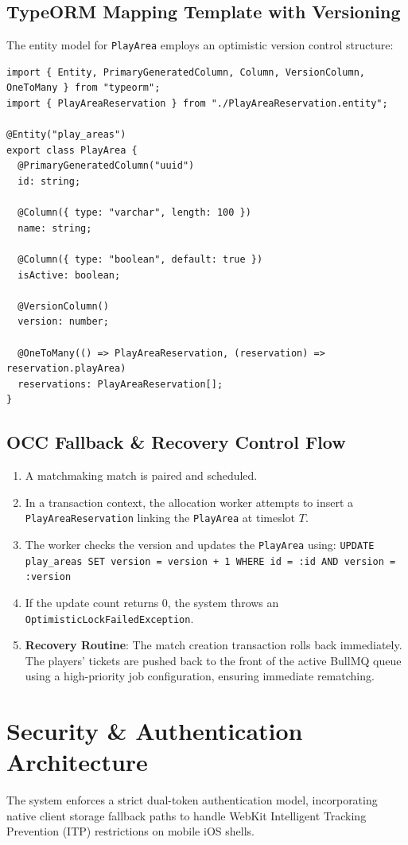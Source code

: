 \documentclass[11pt,a4paper]{report}
\begin{document}
\subsection{TypeORM Mapping Template with Versioning}
The entity model for \texttt{PlayArea} employs an optimistic version control structure:
\begin{lstlisting}[caption={PlayArea Entity TypeORM Definition}]
import { Entity, PrimaryGeneratedColumn, Column, VersionColumn, OneToMany } from "typeorm";
import { PlayAreaReservation } from "./PlayAreaReservation.entity";

@Entity("play_areas")
export class PlayArea {
  @PrimaryGeneratedColumn("uuid")
  id: string;

  @Column({ type: "varchar", length: 100 })
  name: string;

  @Column({ type: "boolean", default: true })
  isActive: boolean;

  @VersionColumn()
  version: number;

  @OneToMany(() => PlayAreaReservation, (reservation) => reservation.playArea)
  reservations: PlayAreaReservation[];
}
\end{lstlisting}

\subsection{OCC Fallback \& Recovery Control Flow}
\begin{enumerate}
    \item A matchmaking match is paired and scheduled.
    \item In a transaction context, the allocation worker attempts to insert a \texttt{PlayAreaReservation} linking the \texttt{PlayArea} at timeslot $T$.
    \item The worker checks the version and updates the \texttt{PlayArea} using:
        \texttt{UPDATE play\_areas SET version = version + 1 WHERE id = :id AND version = :version}
    \item If the update count returns 0, the system throws an \texttt{OptimisticLockFailedException}.
    \item \textbf{Recovery Routine}: The match creation transaction rolls back immediately. The players' tickets are pushed back to the front of the active BullMQ queue using a high-priority job configuration, ensuring immediate rematching.
\end{enumerate}

\section{Security \& Authentication Architecture}
The system enforces a strict dual-token authentication model, incorporating native client storage fallback paths to handle WebKit Intelligent Tracking Prevention (ITP) restrictions on mobile iOS shells.
\end{document}
